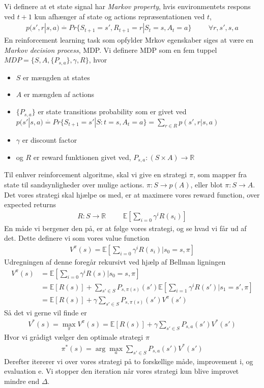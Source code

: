 \documentclass[paper=a4, fontsize=11pt]{scrartcl} %
\numberwithin{equation}{section} %
\numberwithin{figure}{section} %
\numberwithin{table}{section} %
\begin{document}
	Vi definere at et state signal har \textit{Markov property}, hvis environmentets respons ved $t+1$ kun afhænger af state og actions repræsentationen ved $t$,
	\begin{align*}
	p(s',r|s,a)\stackrel{\cdot}{=}Pr\{S_{t+1}=s', R_{t+1}=r|S_t=s, A_t=a\} \hspace{1cm}\forall r,s',s,a
	\end{align*}
	En reinforcement learning task som opfylder Mrkov egenskaber siges at være en \textit{Markov decision process}, MDP. Vi definere MDP som en fem tuppel $MDP=\{S,A,\{P_{s,a}\},\gamma,R\}$, hvor 
	\begin{itemize}
		\item $S$ er mængden at states
		\item $A$ er mængden af actions
		\item  $\{P_{s,a}\}$ er state transitions probability som er givet ved $p(s'|s,a)\stackrel{\cdot}{=}Pr\{S_{t+1}=s'|S:t=s,A_t=a\}=\sum_{r\in R}p(s',r|s,a)$
		\item $\gamma$ er discount factor
		\item og $R$ er reward funktionen givet ved, $P_{s,a}:(S\times A)\rightarrow \mathbb{R}$
	\end{itemize}
	Til enhver reinforcement algoritme, skal vi give en strategi $\pi$, som mapper fra state til sandsynligheder over mulige actions. $\pi:S\rightarrow p(A)$, eller blot $\pi:S\rightarrow A$. Det vores strategi skal hjælpe os med, er at maximere vores reward function, over expected returns
	\begin{align*}
	R:S\rightarrow \mathbb{R} \hspace{1cm} \mathbb{E}\left[\sum_{i=0}\gamma^i R(s_i)\right]
	\end{align*}
	En måde vi bergener den på, er at følge vores strategi, og se hvad vi får ud af det. Dette definere vi som vores value function
	\begin{align*}
	V^\pi(s)=\mathbb{E}\left[\sum_{i=0}\gamma^i R(s_i)|s_0=s,\pi\right]
	\end{align*}
	Udregningen af denne foregår rekursivt ved hjælp af Bellman ligningen
	\begin{align*}
	V^\pi(s)&=\mathbb{E}\left[\sum_{i=0}\gamma^iR(s)|s_0=s,\pi\right] \\
	&=\mathbb{E}\left[R(s)\right]+\sum_{s'\in S}P_{s,\pi(s)}(s')\mathbb{E}\left[\sum_{i=1}\gamma^iR(s')|s_1=s',\pi\right] \\
	&=\mathbb{E}\left[R(s)\right]+\gamma\sum_{s'\in S}P_{s,\pi(s)}(s')V^\pi(s')
	\end{align*}
	Så det vi gerne vil finde er 
	\begin{align*}
	V^*(s)=\underset{\pi}{\max}V^\pi(s)=\mathbb{E}\left[R(s)\right]+\gamma\sum_{s'\in S}P_{s,a}(s')V^*(s')
	\end{align*}
	Hvor vi grådigt vælger den optimale strategi $\pi$
	\begin{align*}
	\pi^*(s)=\arg\underset{a}{\max}\sum_{s'\in S}P_{s,a}(s')V^*(s')
	\end{align*}
	Derefter itererer vi over vores strategi på to forskellige måde, improvement i, og evaluation e. Vi stopper den iteration når vores strategi kun blive improvet mindre end $\Delta$.
	
	
\end{document}
